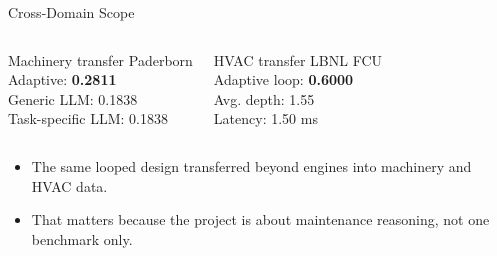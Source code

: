 \begin{frame}{Cross-Domain Scope}
  \begin{columns}[T]
    \begin{block}{Machinery transfer}
      \centering
      \vspace{0.15cm}
      {\large Paderborn}\\[0.15cm]
      Adaptive: \textbf{0.2811}\\
      Generic LLM: 0.1838\\
      Task-specific LLM: 0.1838
      \vspace{0.15cm}
    \end{block}
    \begin{block}{HVAC transfer}
      \centering
      \vspace{0.15cm}
      {\large LBNL FCU}\\[0.15cm]
      Adaptive loop: \textbf{0.6000}\\
      Avg. depth: 1.55\\
      Latency: 1.50 ms
      \vspace{0.15cm}
    \end{block}
  \end{columns}
\vspace{0.3cm}
  \begin{itemize}
    \item The same looped design transferred beyond engines into machinery and HVAC data.
    \item That matters because the project is about maintenance reasoning, not one benchmark only.
  \end{itemize}
\end{frame}
